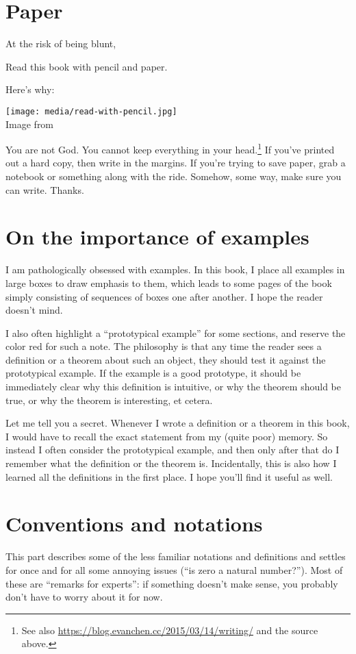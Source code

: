 \section{Paper}
At the risk of being blunt,
\begin{moral}
Read this book with pencil and paper.
\end{moral}
Here's why:

\begin{center}
	\texttt{[image: media/read-with-pencil.jpg]}
	\\ \scriptsize Image from \cite{img:read_with_pencil}
\end{center}
You are not God.
You cannot keep everything in your head.\footnote{See also
	\url{https://blog.evanchen.cc/2015/03/14/writing/} and the source above.}
If you've printed out a hard copy, then write in the margins.
If you're trying to save paper,
grab a notebook or something along with the ride.
Somehow, some way, make sure you can write. Thanks.

\section{On the importance of examples}
I am pathologically obsessed with examples.
In this book, I place all examples in large boxes to draw emphasis to them,
which leads to some pages of the book simply consisting of sequences of boxes
one after another. I hope the reader doesn't mind.

I also often highlight a ``prototypical example'' for some sections,
and reserve the color red for such a note.
The philosophy is that any time the reader sees a definition
or a theorem about such an object, they should test it
against the prototypical example.
If the example is a good prototype, it should be immediately clear
why this definition is intuitive, or why the theorem should be true,
or why the theorem is interesting, et cetera.

Let me tell you a secret.  Whenever I wrote a definition or a theorem in this book,
I would have to recall the exact statement from my (quite poor) memory.
So instead I often consider the prototypical example,
and then only after that do I remember what the definition or the theorem is.
Incidentally, this is also how I learned all the definitions in the first place.
I hope you'll find it useful as well.

\section{Conventions and notations}
This part describes some of the less familiar notations and definitions
and settles for once and for all some annoying issues
(``is zero a natural number?'').
Most of these are ``remarks for experts'':
if something doesn't make sense,
you probably don't have to worry about it for now.

